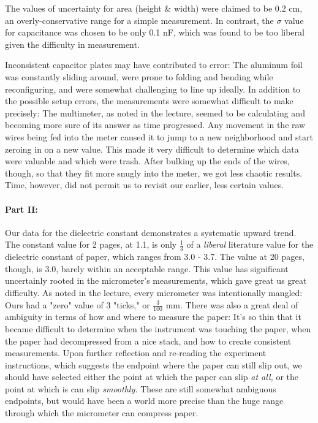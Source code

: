 \documentclass[11pt,letterpaper]{report}
\begin{document}
The values of uncertainty for area (height \& width) were claimed to be 0.2 cm, an overly-conservative range for a simple measurement. In contrast, the $\sigma$ value for capacitance was chosen to be only 0.1 nF, which was found to be too liberal given the difficulty in measurement.

Inconsistent capacitor plates may have contributed to error: The aluminum foil was constantly sliding around, were prone to folding and bending while reconfiguring, and were somewhat challenging to line up ideally. In addition to the possible setup errors, the measurements were somewhat difficult to make precisely: The multimeter, as noted in the lecture, seemed to be calculating and becoming more sure of its answer as time progressed. Any movement in the raw wires being fed into the meter caused it to jump to a new neighborhood and start zeroing in on a new value. This made it very difficult to determine which data were valuable and which were trash. After bulking up the ends of the wires, though, so that they fit more snugly into the meter, we got less chaotic results. Time, however, did not permit us to revisit our earlier, less certain values. 

\paragraph{Part II:}
Our data for the dielectric constant demonstrates a systematic upward trend. The constant value for 2 pages, at 1.1, is only $\frac{1}{3}$ of a \emph{liberal} literature value for the dielectric constant of paper, which ranges from 3.0 - 3.7. The value at 20 pages, though, is 3.0, barely within an acceptable range. This value has significant uncertainly rooted in the micrometer's measurements, which gave great us great difficulty. As noted in the lecture, every micrometer was intentionally mangled: Ours had a "zero" value of 3 "ticks," or $\frac{3}{100}$ mm. There was also a great deal of ambiguity in terms of how and where to measure the paper: It's so thin that it became difficult to determine when the instrument was touching the paper, when the paper had decompressed from a nice stack, and how to create consistent measurements. Upon further reflection and re-reading the experiment instructions, which  suggests the endpoint where the paper can still slip out, we should have selected either the point at which the paper can slip \emph{at all,} or the point at which is can slip \emph{smoothly.} These are still somewhat ambiguous endpoints, but would have been a world more precise than the huge range through which the micrometer can compress paper.



\vspace{1cm}
\end{document}
